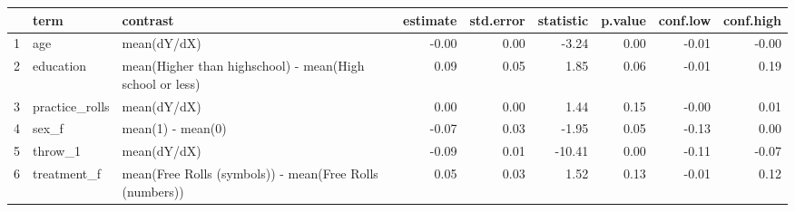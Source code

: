 \begin{table}[ht]
\centering
\begin{tabular}{rllrrrrrr}
  \hline
 & term & contrast & estimate & std.error & statistic & p.value & conf.low & conf.high \\ 
  \hline
1 & age & mean(dY/dX) & -0.00 & 0.00 & -3.24 & 0.00 & -0.01 & -0.00 \\ 
  2 & education & mean(Higher than highschool) - mean(High school or less) & 0.09 & 0.05 & 1.85 & 0.06 & -0.01 & 0.19 \\ 
  3 & practice\_rolls & mean(dY/dX) & 0.00 & 0.00 & 1.44 & 0.15 & -0.00 & 0.01 \\ 
  4 & sex\_f & mean(1) - mean(0) & -0.07 & 0.03 & -1.95 & 0.05 & -0.13 & 0.00 \\ 
  5 & throw\_1 & mean(dY/dX) & -0.09 & 0.01 & -10.41 & 0.00 & -0.11 & -0.07 \\ 
  6 & treatment\_f & mean(Free Rolls (symbols)) - mean(Free Rolls (numbers)) & 0.05 & 0.03 & 1.52 & 0.13 & -0.01 & 0.12 \\ 
   \hline
\end{tabular}
\end{table}
